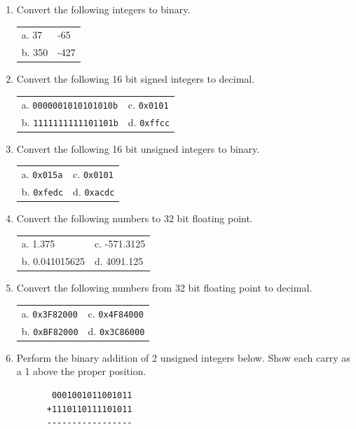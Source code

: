 \documentclass[11pt,b5paper]{book}
\begin{document}
\begin{enumerate}

\item Convert the following integers to binary.

\begin{tabular}{p{2in}p{2in}}
a. 37    & -65 \\
b. 350   & -427
\end{tabular}

\item Convert the following 16 bit signed integers to decimal.

\begin{tabular}{p{2in}p{2in}}
a. {\tt 0000001010101010b}    & c. {\tt 0x0101} \\
b. {\tt 1111111111101101b}    & d. {\tt 0xffcc} \\
\end{tabular}

\item Convert the following 16 bit unsigned integers to binary.

\begin{tabular}{p{2in}p{2in}}
a. {\tt 0x015a}    & c. {\tt 0x0101} \\
b. {\tt 0xfedc}    & d. {\tt 0xacdc} \\
\end{tabular}

\item Convert the following numbers to 32 bit floating point.

\begin{tabular}{p{2in}p{2in}}
a. 1.375    & c. -571.3125 \\
b. 0.041015625    & d. 4091.125 \\
\end{tabular}

\item Convert the following numbers from 32 bit floating point to decimal.

\begin{tabular}{p{2in}p{2in}}
a. {\tt 0x3F82000}    & c. {\tt 0x4F84000} \\
b. {\tt 0xBF82000}    & d. {\tt 0x3C86000} \\
\end{tabular}

\item Perform the binary addition of 2 unsigned integers below.  Show each
carry as a 1 above the proper position.

\begin{verbatim}
       0001001011001011
      +1110110111101011
      -----------------
\end{verbatim}


\end{enumerate}
\end{document}
